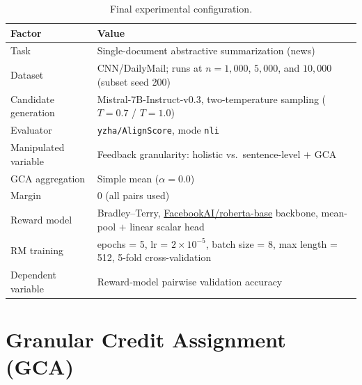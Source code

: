 \begin{table}[htbp]
\centering
\caption[Final experimental configuration]{Final experimental configuration.}
\label{tab:methodology-summary}
\begin{tabularx}{\textwidth}{lX}
\toprule
Factor & Value \\
\midrule
Task & Single-document abstractive summarization (news) \\
Dataset & CNN/DailyMail; runs at $n=1{,}000$, $5{,}000$, and $10{,}000$
  (subset seed 200) \\
Candidate generation & Mistral-7B-Instruct-v0.3, two-temperature sampling
  ($T=0.7$ / $T=1.0$) \\
Evaluator & \texttt{yzha/AlignScore}, mode \texttt{nli}\footnotemark \\
Manipulated variable & Feedback granularity: holistic vs.\ sentence-level $+$ GCA \\
GCA aggregation & Simple mean ($\alpha = 0.0$)\footnotemark[\value{footnote}] \\
Margin & 0 (all pairs used) \\
Reward model & Bradley--Terry, \url{FacebookAI/roberta-base} backbone,
  mean-pool $+$ linear scalar head \\
RM training & epochs = 5, lr = $2\times10^{-5}$, batch size = 8,
  max length = 512, 5-fold cross-validation \\
Dependent variable & Reward-model pairwise validation accuracy \\
\bottomrule
\end{tabularx}
\end{table}

\section{Granular Credit Assignment (GCA)}
\label{sec:bg-gca}

